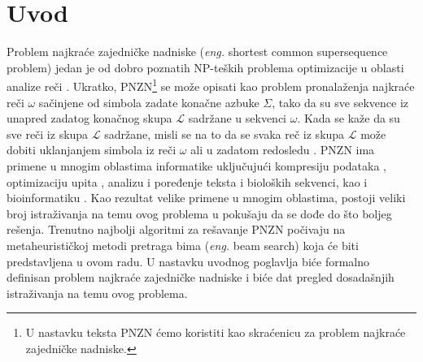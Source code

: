\documentclass[12pt,oneside]{memoir}
\begin{document}
\frontmatter
\naslovna
\komisija
\apstrakt
\tableofcontents*

\mainmatter

\chapter{Uvod}
\label{chap:uvod}
Problem najkraće zajedničke nadniske (\textit{eng.} shortest common supersequence problem)
jedan je od dobro poznatih NP-teških problema optimizacije u oblasti analize reči \cite{ProbabilisticBS}.
Ukratko, PNZN\footnote{U nastavku teksta PNZN ćemo koristiti kao skraćenicu za problem najkraće zajedničke nadniske.}
se može opisati kao problem pronalaženja najkraće reči $\omega$ sačinjene
od simbola zadate konačne azbuke $\Sigma$, tako da su sve sekvence iz unapred zadatog konačnog skupa
$\mathcal{L}$ sadržane u sekvenci $\omega$. Kada se kaže da su sve reči iz skupa $\mathcal{L}$
sadržane, misli se na to da se svaka reč iz skupa $\mathcal{L}$ može dobiti uklanjanjem simbola iz reči $\omega$ ali 
u zadatom redosledu \cite{SCSSProblemDef}. PNZN ima primene u mnogim oblastima informatike uključujući kompresiju podataka
\cite{DataCompression}, optimizaciju upita \cite{MQOptimization}, analizu i poređenje teksta i bioloških sekvenci, \cite{ITAlgorithms} \cite{SeqComparison}
kao i bioinformatiku \cite{ProbabilisticBS}.
Kao rezultat velike primene u mnogim oblastima, postoji veliki broj istraživanja na temu ovog problema u pokušaju da se dođe
do što boljeg rešenja. Trenutno najbolji algoritmi za rešavanje PNZN počivaju na metaheurističkoj metodi
pretraga bima (\textit{eng.} beam search) koja će biti predstavljena u ovom radu. U nastavku uvodnog poglavlja biće formalno
definisan problem najkraće zajedničke nadniske i biće dat pregled dosadašnjih istraživanja na temu ovog problema.
\end{document}
